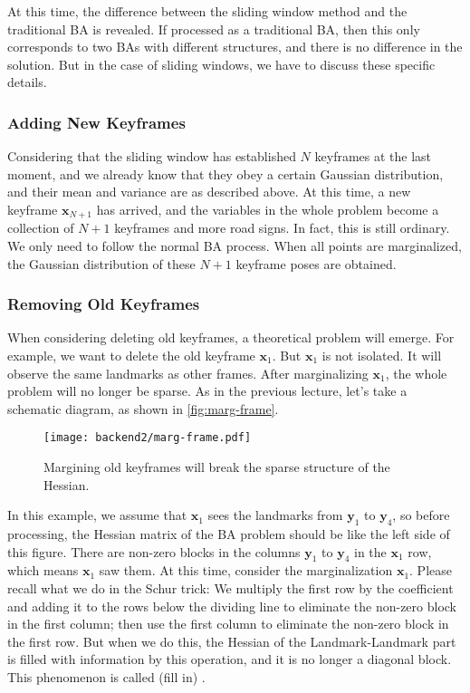 At this time, the difference between the sliding window method and the traditional BA is revealed. If processed as a traditional BA, then this only corresponds to two BAs with different structures, and there is no difference in the solution. But in the case of sliding windows, we have to discuss these specific details.

\subsubsection{Adding New Keyframes}
Considering that the sliding window has established $N$ keyframes at the last moment, and we already know that they obey a certain Gaussian distribution, and their mean and variance are as described above. At this time, a new keyframe $\bm{x}_{N+1}$ has arrived, and the variables in the whole problem become a collection of $N+1$ keyframes and more road signs. In fact, this is still ordinary. We only need to follow the normal BA process. When all points are marginalized, the Gaussian distribution of these $N+1$ keyframe poses are obtained.

\subsubsection{Removing Old Keyframes}
When considering deleting old keyframes, a theoretical problem will emerge. For example, we want to delete the old keyframe $\bm{x}_1$. But $\bm{x}_1$ is not isolated. It will observe the same landmarks as other frames. After marginalizing $\bm{x}_1$, the whole problem will no longer be sparse. As in the previous lecture, let's take a schematic diagram, as shown in \autoref{fig:marg-frame}.

\begin{figure}[!ht]
	\centering
	\texttt{[image: backend2/marg-frame.pdf]}
	\caption{Margining old keyframes will break the sparse structure of the Hessian.}
	\label{fig:marg-frame}
\end{figure}

In this example, we assume that $\bm{x}_1$ sees the landmarks from $\bm{y}_1$ to $\bm{y}_4$, so before processing, the Hessian matrix of the BA problem should be like the left side of this figure. There are non-zero blocks in the columns $\bm{y}_1$ to $\bm{y}_4$ in the $\bm{x}_1$ row, which means $\bm{x}_1 $ saw them. At this time, consider the marginalization $\bm{x}_1$. Please recall what we do in the Schur trick: We multiply the first row by the coefficient and adding it to the rows below the dividing line to eliminate the non-zero block in the first column; then use the first column to eliminate the non-zero block in the first row. But when we do this, the Hessian of the Landmark-Landmark part is filled with information by this operation, and it is no longer a diagonal block. This phenomenon is called (fill in) {\cite{Sibley2008}}.

